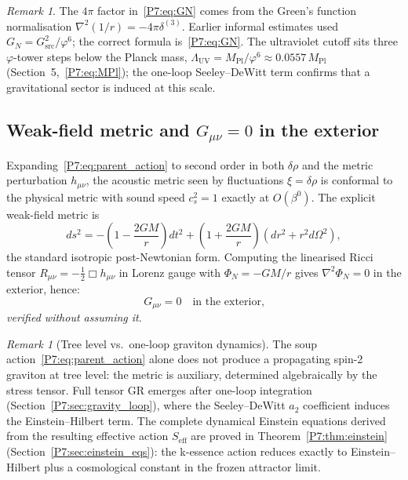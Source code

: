 \documentclass[11pt,a4paper]{article}
\theoremstyle{definition}
\theoremstyle{remark}
\newtheorem{remark}[theorem]{Remark}
\newcommand{\vp}{\varphi}
\newcommand{\MPl}{M_{\mathrm{Pl}}}
\newcommand{\LUV}{\Lambda_{\mathrm{UV}}}
\begin{document}
\begin{remark}
\label{P7:rem:4pi_factor}
The $4\pi$ factor in~\eqref{P7:eq:GN} comes from the Green's function
normalisation $\nabla^2(1/r)=-4\pi\delta^{(3)}$.
Earlier informal estimates used $G_N=G_{\mathrm{src}}^2/\vp^6$; the
correct formula is~\eqref{P7:eq:GN}.
The ultraviolet cutoff sits three $\vp$-tower steps below the Planck mass,
$\LUV = \MPl/\vp^6\approx0.0557\,\MPl$ (Section~5,~\eqref{P7:eq:MPl}); the
one-loop Seeley--DeWitt term confirms that a gravitational sector is induced
at this scale.
\end{remark}

\subsection{Weak-field metric and $G_{\mu\nu}=0$ in the exterior}

Expanding~\eqref{P7:eq:parent_action} to second order in both $\delta\rho$
and the metric perturbation $h_{\mu\nu}$, the acoustic metric seen by
fluctuations $\xi=\delta\rho$ is conformal to the physical metric with
sound speed $c_s^2=1$ exactly at $O(\beta^0)$.
The explicit weak-field metric is
\begin{equation}
  ds^2 = -\!\left(1-\frac{2GM}{r}\right)dt^2
         + \left(1+\frac{2GM}{r}\right)(dr^2+r^2d\Omega^2),
\end{equation}
the standard isotropic post-Newtonian form.
Computing the linearised Ricci tensor
$R_{\mu\nu}=-\frac{1}{2}\Box h_{\mu\nu}$ in Lorenz gauge with
$\Phi_N=-GM/r$ gives $\nabla^2\Phi_N=0$ in the exterior, hence:
\begin{equation}
  G_{\mu\nu} = 0 \quad\text{in the exterior,}
  \label{P7:eq:Gmunu_zero}
\end{equation}
\emph{verified without assuming it}.

\begin{remark}[Tree level vs.\ one-loop graviton dynamics]
\label{P7:rem:spin2}
The soup action~\eqref{P7:eq:parent_action} alone does not produce a
propagating spin-2 graviton at tree level: the metric is auxiliary,
determined algebraically by the stress tensor.  Full tensor GR emerges
after one-loop integration (Section~\ref{P7:sec:gravity_loop}), where the
Seeley--DeWitt $a_2$ coefficient induces the Einstein--Hilbert term.
The complete dynamical Einstein equations derived from the resulting
effective action $S_{\mathrm{eff}}$ are proved in Theorem~\ref{P7:thm:einstein}
(Section~\ref{P7:sec:einstein_eqs}): the k-essence action reduces exactly to
Einstein--Hilbert plus a cosmological constant in the frozen attractor limit.
\end{remark}
\end{document}
